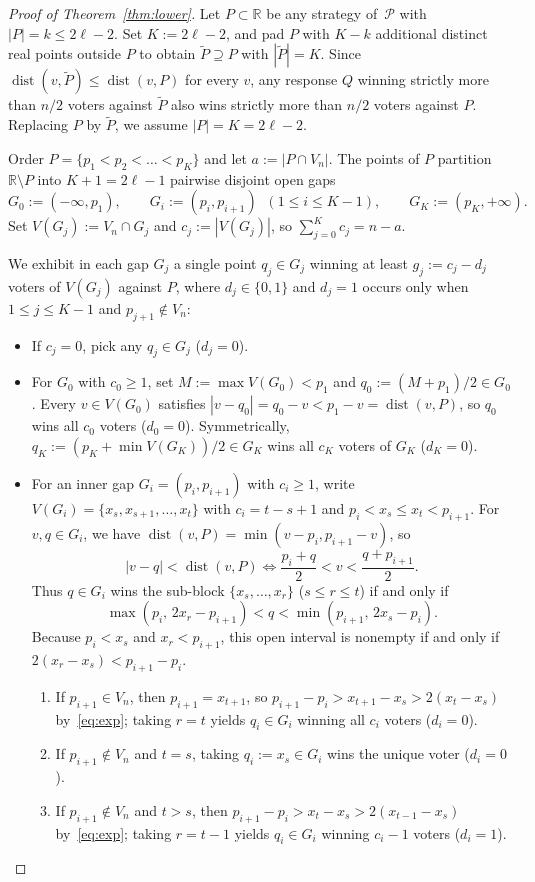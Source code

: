 \documentclass[11pt]{article}
\newcommand{\dist}{\operatorname{dist}}
\begin{document}
\begin{proof}[Proof of Theorem~\ref{thm:lower}]
Let $P \subset \mathbb{R}$ be any strategy of~$\mathcal{P}$ with $|P| = k \le 2\ell - 2$. Set $K := 2\ell - 2$, and pad $P$ with $K - k$ additional distinct real points outside $P$ to obtain $\widetilde{P} \supseteq P$ with $|\widetilde{P}| = K$. Since $\dist(v, \widetilde{P}) \le \dist(v, P)$ for every $v$, any response $Q$ winning strictly more than $n/2$ voters against $\widetilde{P}$ also wins strictly more than $n/2$ voters against $P$. Replacing $P$ by $\widetilde{P}$, we assume $|P| = K = 2\ell - 2$.

Order $P = \{p_1 < p_2 < \dots < p_K\}$ and let $a := |P \cap V_n|$. The points of $P$ partition $\mathbb{R} \setminus P$ into $K + 1 = 2\ell - 1$ pairwise disjoint open gaps
\[
G_0 := (-\infty, p_1), \qquad G_i := (p_i, p_{i+1}) \;\;(1 \le i \le K - 1), \qquad G_K := (p_K, +\infty).
\]
Set $V(G_j) := V_n \cap G_j$ and $c_j := |V(G_j)|$, so $\sum_{j=0}^K c_j = n - a$.

We exhibit in each gap $G_j$ a single point $q_j \in G_j$ winning at least $g_j := c_j - d_j$ voters of $V(G_j)$ against $P$, where $d_j \in \{0, 1\}$ and $d_j = 1$ occurs only when $1 \le j \le K - 1$ and $p_{j+1} \notin V_n$:
\begin{itemize}
\item If $c_j = 0$, pick any $q_j \in G_j$ ($d_j = 0$).
\item For $G_0$ with $c_0 \ge 1$, set $M := \max V(G_0) < p_1$ and $q_0 := (M + p_1)/2 \in G_0$. Every $v \in V(G_0)$ satisfies $|v - q_0| = q_0 - v < p_1 - v = \dist(v, P)$, so $q_0$ wins all $c_0$ voters ($d_0 = 0$). Symmetrically, $q_K := (p_K + \min V(G_K))/2 \in G_K$ wins all $c_K$ voters of $G_K$ ($d_K = 0$).
\item For an inner gap $G_i = (p_i, p_{i+1})$ with $c_i \ge 1$, write $V(G_i) = \{x_s, x_{s+1}, \dots, x_t\}$ with $c_i = t - s + 1$ and $p_i < x_s \le x_t < p_{i+1}$. For $v, q \in G_i$, we have $\dist(v, P) = \min(v - p_i, p_{i+1} - v)$, so
\[
|v - q| < \dist(v, P) \iff \frac{p_i + q}{2} < v < \frac{q + p_{i+1}}{2}.
\]
Thus $q \in G_i$ wins the sub-block $\{x_s, \dots, x_r\}$ ($s \le r \le t$) if and only if
\[
\max(p_i,\, 2x_r - p_{i+1}) < q < \min(p_{i+1},\, 2x_s - p_i).
\]
Because $p_i < x_s$ and $x_r < p_{i+1}$, this open interval is nonempty if and only if $2(x_r - x_s) < p_{i+1} - p_i$.
\begin{enumerate}
\item If $p_{i+1} \in V_n$, then $p_{i+1} = x_{t+1}$, so $p_{i+1} - p_i > x_{t+1} - x_s > 2(x_t - x_s)$ by~\eqref{eq:exp}; taking $r = t$ yields $q_i \in G_i$ winning all $c_i$ voters ($d_i = 0$).
\item If $p_{i+1} \notin V_n$ and $t = s$, taking $q_i := x_s \in G_i$ wins the unique voter ($d_i = 0$).
\item If $p_{i+1} \notin V_n$ and $t > s$, then $p_{i+1} - p_i > x_t - x_s > 2(x_{t-1} - x_s)$ by~\eqref{eq:exp}; taking $r = t - 1$ yields $q_i \in G_i$ winning $c_i - 1$ voters ($d_i = 1$).
\end{enumerate}
\end{itemize}


\end{proof}
\end{document}
